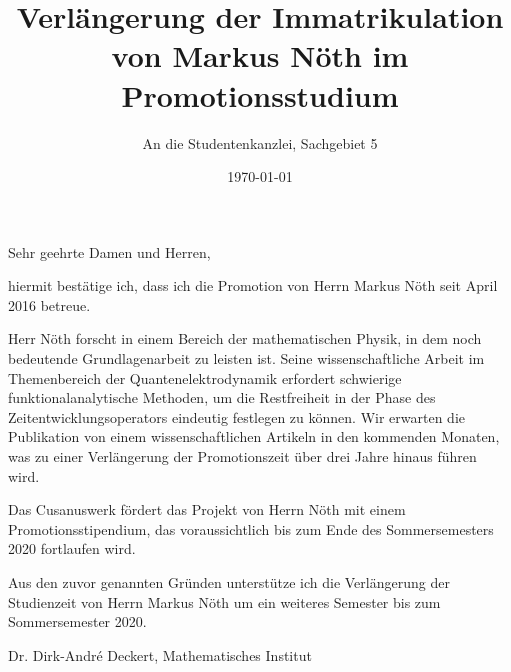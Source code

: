 \documentclass[11pt,a4paper]{article}
\begin{document}
\title{Verlängerung der Immatrikulation von Markus Nöth im Promotionsstudium }

\author{An die Studentenkanzlei, Sachgebiet 5}

\date{\today}
\maketitle


Sehr geehrte Damen und Herren,

hiermit bestätige ich, dass ich die Promotion von Herrn Markus Nöth seit April 2016 betreue.

Herr Nöth forscht in einem Bereich der mathematischen Physik, in dem noch bedeutende Grundlagenarbeit zu leisten ist. Seine wissenschaftliche Arbeit im Themenbereich der Quantenelektrodynamik erfordert schwierige funktionalanalytische Methoden, um die Restfreiheit in der Phase des Zeitentwicklungsoperators eindeutig festlegen zu können. Wir erwarten die Publikation von einem wissenschaftlichen Artikeln in den kommenden Monaten, was zu einer Verlängerung der Promotionszeit über drei Jahre hinaus führen wird.

Das Cusanuswerk fördert das Projekt von Herrn Nöth mit einem Promotionsstipendium, das voraussichtlich bis zum Ende des Sommersemesters 2020 fortlaufen wird.

Aus den zuvor genannten Gründen unterstütze ich die Verlängerung der Studienzeit von Herrn Markus Nöth um ein weiteres Semester bis zum Sommersemester 2020.

\vspace*{2cm}
Dr. Dirk-Andr\'e Deckert, Mathematisches Institut

\maketitle
\end{document}

